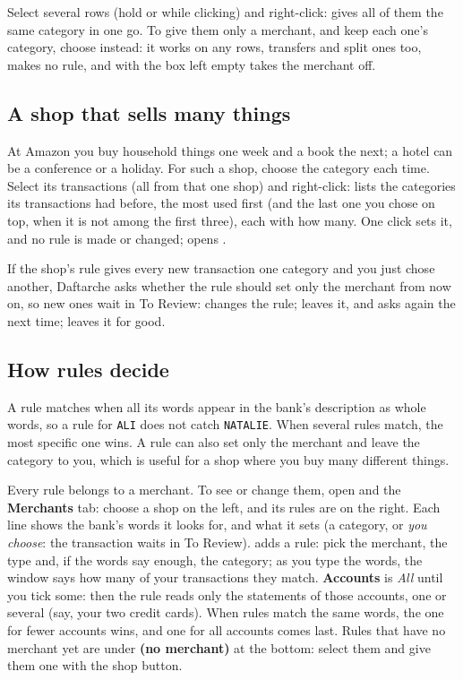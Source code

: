 \documentclass[11pt]{article}
\begin{document}
\begin{tip}
Select several rows (hold  or  while clicking) and right-click:  gives all of them the same category in one go. To give them only a merchant, and keep
each one's category, choose  instead: it works on any rows, transfers and split
ones too, makes no rule, and with the box left empty takes the merchant off.
\end{tip}

\subsection{A shop that sells many things}
At Amazon you buy household things one week and a book the next; a hotel can be a conference or a
holiday. For such a shop, choose the category each time. Select its transactions (all from that
one shop) and right-click:  lists the categories its transactions had
before, the most used first (and the last one you chose on top, when it is not among the first
three), each with how many. One click sets it, and no rule is made or changed;  opens
.

If the shop's rule gives every new transaction one category and you just chose another, Daftarche
asks whether the rule should set only the merchant from now on, so new ones wait in To Review:
 changes the rule;  leaves it, and asks again the next
time;  leaves it for good.

\subsection{How rules decide}
A rule matches when all its words appear in the bank's description as whole words, so a rule
for \texttt{ALI} does not catch \texttt{NATALIE}. When several rules match, the most specific one wins.
A rule can also set only the merchant and leave the category to you, which is useful for a shop
where you buy many different things.

Every rule belongs to a merchant. To see or change them, open  and the
\textbf{Merchants} tab: choose a shop on the left, and its rules are on the right. Each line shows the
bank's words it looks for, and what it sets (a category, or \emph{you choose}: the transaction waits
in To Review). \button{+} adds a rule: pick the merchant, the type and, if the words say enough, the
category; as you type the words, the window says how many of your transactions they match.
\textbf{Accounts} is \emph{All} until you tick some: then the rule reads only the statements of those
accounts, one or several (say, your two credit cards). When rules match the same words, the one for
fewer accounts wins, and one for all accounts comes last. Rules
that have no merchant yet are under \textbf{(no merchant)} at the bottom: select them and give them
one with the shop button.
\end{document}
